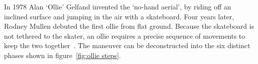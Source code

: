 \documentclass[default,iicol]{sn-jnl}
\begin{document}
In 1978 Alan `Ollie' Gelfand invented the `no-hand aerial', by riding off an inclined surface and jumping in the air with a skateboard.
Four years later, Rodney Mullen debuted the first ollie from flat ground.
Because the skateboard is not tethered to the skater, an ollie requires a precise sequence of movements to keep the two together~\cite{frederick_biomechanics_2006}.
The maneuver can be deconstructed into the six
distinct phases shown in figure~\ref{fig:ollie steps}.

\begin{figure}[!t]
\captionsetup[subfigure]{labelformat=empty}

\end{figure}
\end{document}
